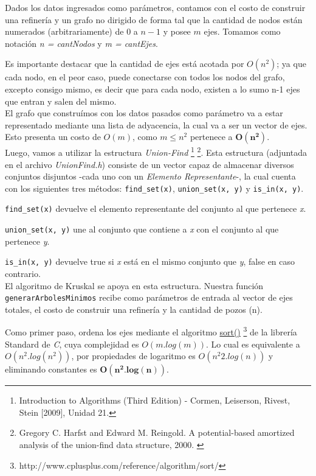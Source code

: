 Dados los datos ingresados como par\'ametros, contamos con el costo de construir una refiner\'ia y un grafo no dirigido de forma tal que la cantidad de nodos  est\'an numerados (arbitrariamente) de $0$ a $n-1$ y posee $m$ ejes. Tomamos como notaci\'on \emph{n = cantNodos} y \emph{m = cantEjes}.

Es importante destacar que la cantidad de ejes est\'a acotada por $O(n^2)$; ya que cada nodo, en el peor caso, puede conectarse con todos los nodos del grafo, excepto consigo mismo, es decir que para cada nodo, existen a lo sumo n-1 ejes que entran y salen del mismo.\\

El grafo que constru\'imos con los datos pasados como par\'ametro va a estar representado mediante una lista de adyacencia, la cual va a ser un vector de ejes. Esto presenta un costo de $O(m)$, como $m \leq n^2$ pertenece a $\mathbf{O(n^2)}$.\\

Luego, vamos a utilizar la estructura \emph{Union-Find} \footnote{Introduction to Algorithms (Third Edition) - Cormen, Leiserson, Rivest, Stein [2009], Unidad 21.} \footnote{Gregory C. Harfst and Edward M. Reingold. A potential-based amortized analysis of the
union-find data structure, 2000.	\label{paper}}. Esta estructura (adjuntada en el archivo \textit{UnionFind.h}) consiste de un vector capaz de almacenar diversos conjuntos disjuntos -cada uno con un \emph{Elemento Representante}-, la cual cuenta con los siguientes tres m\'etodos: \texttt{find_set(x)}, \texttt{union_set(x, y)} y \texttt{is_in(x, y)}. 

\texttt{find_set(x)} devuelve el elemento representante del conjunto al que pertenece \emph{x}.

\texttt{union_set(x, y)} une al conjunto que contiene a \emph{x} con el conjunto al que pertenece \emph{y}. 
 
\texttt{is_in(x, y)} devuelve true si \emph{x} est\'a en el mismo conjunto que \emph{y}, false en caso contrario. \\


El algoritmo de Kruskal se apoya en esta estructura. Nuestra funci\'on \texttt{generarArbolesMinimos} recibe como par\'ametros de entrada al vector de ejes totales, el costo de construir una refiner\'ia y la cantidad de pozos (n).


Como primer paso, ordena los ejes mediante el algoritmo  \href{http://www.cplusplus.com/reference/algorithm/sort/}{sort()} \footnote{http://www.cplusplus.com/reference/algorithm/sort/} de la librer\'ia Standard de \emph{C}, cuya complejidad es $O(m.log(m))$. Lo cual es equivalente a $O(n^2.log(n^2))$, por propiedades de logaritmo es $O(n^{2}2.log(n))$ y eliminando constantes es $\mathbf{O(n^2.log(n))}$. \\

